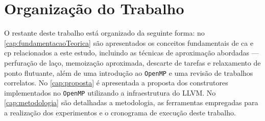 \section{Organização do Trabalho}\label{cap:org_trabalho}

O restante deste trabalho está organizado da seguinte forma: no \autoref{cap:fundamentacaoTeorica} são apresentados os conceitos fundamentais de \gls{ca} e \gls{cp} relacionados a este estudo, incluindo as técnicas de aproximação abordadas — perfuração de laço, memoização aproximada, descarte de tarefas e relaxamento de ponto flutuante, além de uma introdução ao \texttt{OpenMP} e uma revisão de trabalhos correlatos. No \autoref{cap:proposta} é apresentada a proposta dos construtores implementados no \texttt{OpenMP} utilizando a infraestrutura do LLVM. No \autoref{cap:metodologia} são detalhadas a metodologia, as ferramentas empregadas para a realização dos experimentos e o cronograma de execução deste trabalho.

